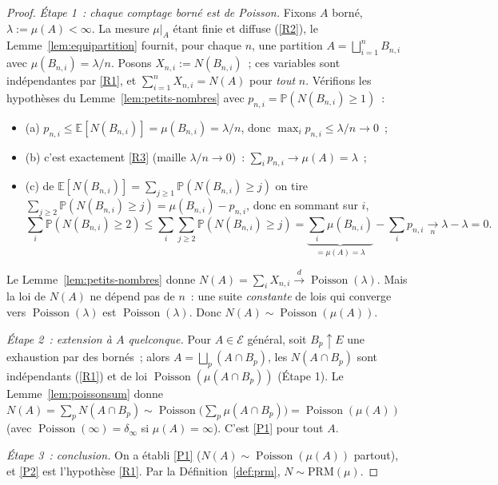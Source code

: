 \documentclass[11pt,a4paper]{article}
\theoremstyle{plain}
\theoremstyle{definition}
\newcommand{\E}{\mathbb{E}}
\newcommand{\PP}{\mathbb{P}}
\newcommand{\Poi}{\operatorname{Poisson}}
\newcommand{\calE}{\mathcal{E}}
\begin{document}
\begin{proof}
\emph{Étape 1~: chaque comptage borné est de Poisson.} Fixons $A$ borné, $\lambda:=\mu(A)<\infty$. La mesure $\mu|_A$ étant finie et diffuse (\ref{R2}), le Lemme~\ref{lem:equipartition} fournit, pour chaque $n$, une partition $A=\bigsqcup_{i=1}^{n}B_{n,i}$ avec $\mu(B_{n,i})=\lambda/n$. Posons $X_{n,i}:=N(B_{n,i})$~; ces variables sont indépendantes par \ref{R1}, et $\sum_{i=1}^n X_{n,i}=N(A)$ pour \emph{tout} $n$. Vérifions les hypothèses du Lemme~\ref{lem:petits-nombres} avec $p_{n,i}=\PP(N(B_{n,i})\ge1)$~:
\begin{itemize}
\item (a) $p_{n,i}\le\E[N(B_{n,i})]=\mu(B_{n,i})=\lambda/n$, donc $\max_i p_{n,i}\le\lambda/n\to0$~;
\item (b) c'est exactement \ref{R3} (maille $\lambda/n\to0$)~: $\sum_i p_{n,i}\to\mu(A)=\lambda$~;
\item (c) de $\E[N(B_{n,i})]=\sum_{j\ge1}\PP(N(B_{n,i})\ge j)$ on tire $\sum_{j\ge2}\PP(N(B_{n,i})\ge j)=\mu(B_{n,i})-p_{n,i}$, donc en sommant sur $i$,
\[
\sum_i\PP(N(B_{n,i})\ge2)\le\sum_i\sum_{j\ge2}\PP(N(B_{n,i})\ge j)=\underbrace{\sum_i\mu(B_{n,i})}_{=\mu(A)=\lambda}-\sum_i p_{n,i}\xrightarrow[n]{}\lambda-\lambda=0 .
\]
\end{itemize}
Le Lemme~\ref{lem:petits-nombres} donne $N(A)=\sum_i X_{n,i}\xrightarrow{d}\Poi(\lambda)$. Mais la loi de $N(A)$ ne dépend pas de $n$~: une suite \emph{constante} de lois qui converge vers $\Poi(\lambda)$ est $\Poi(\lambda)$. Donc $N(A)\sim\Poi(\mu(A))$.

\emph{Étape 2~: extension à $A$ quelconque.} Pour $A\in\calE$ général, soit $B_p\uparrow E$ une exhaustion par des bornés~; alors $A=\bigsqcup_p(A\cap B_p)$, les $N(A\cap B_p)$ sont indépendants (\ref{R1}) et de loi $\Poi(\mu(A\cap B_p))$ (Étape 1). Le Lemme~\ref{lem:poissonsum} donne $N(A)=\sum_p N(A\cap B_p)\sim\Poi\big(\sum_p\mu(A\cap B_p)\big)=\Poi(\mu(A))$ (avec $\Poi(\infty)=\delta_\infty$ si $\mu(A)=\infty$). C'est \ref{P1} pour tout $A$.

\emph{Étape 3~: conclusion.} On a établi \ref{P1} ($N(A)\sim\Poi(\mu(A))$ partout), et \ref{P2} est l'hypothèse \ref{R1}. Par la Définition~\ref{def:prm}, $N\sim\mathrm{PRM}(\mu)$.
\end{proof}
\end{document}
